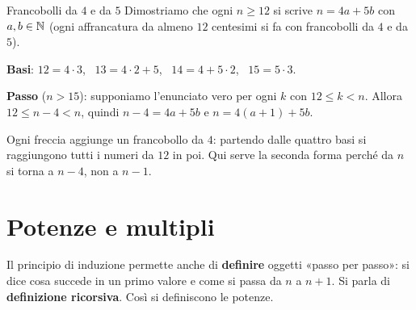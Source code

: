 \begin{esempio}{Francobolli da $4$ e da $5$}
    Dimostriamo che ogni $n \geq 12$ si scrive $n = 4a + 5b$ con $a, b \in \mathbb{N}$ (ogni affrancatura da almeno $12$ centesimi si fa
    con francobolli da $4$ e da $5$).
    \begin{passi}
        \item \textbf{Basi}: $12 = 4 \cdot 3$, \ $13 = 4 \cdot 2 + 5$, \ $14 = 4 + 5 \cdot 2$, \ $15 = 5 \cdot 3$.
        \item \textbf{Passo} ($n > 15$): supponiamo l'enunciato vero per ogni $k$ con $12 \leq k < n$. Allora $12 \leq n - 4 < n$, quindi
              $n - 4 = 4a + 5b$ e $n = 4(a + 1) + 5b$.
    \end{passi}
    \begin{center}
    \end{center}
    Ogni freccia aggiunge un francobollo da $4$: partendo dalle quattro basi si raggiungono tutti i numeri da $12$ in poi. Qui
    serve la seconda forma perché da $n$ si torna a $n - 4$, non a $n - 1$.
\end{esempio}

\section{Potenze e multipli}\label{sec:potenze}

Il principio di induzione permette anche di \textbf{definire} oggetti «passo per passo»: si dice cosa succede in un primo
valore e come si passa da $n$ a $n + 1$. Si parla di \textbf{definizione ricorsiva}. Così si definiscono le potenze.


